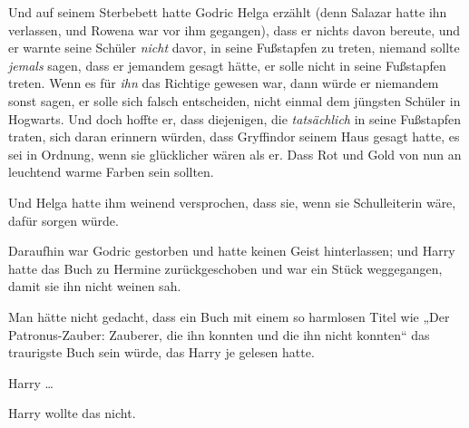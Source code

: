 Und auf seinem Sterbebett hatte Godric Helga erzählt (denn Salazar hatte ihn verlassen, und Rowena war vor ihm gegangen), dass er nichts davon bereute, und er warnte seine Schüler \emph{nicht} davor, in seine Fußstapfen zu treten, niemand sollte \emph{jemals} sagen, dass er jemandem gesagt hätte, er solle nicht in seine Fußstapfen treten. Wenn es für \emph{ihn} das Richtige gewesen war, dann würde er niemandem sonst sagen, er solle sich falsch entscheiden, nicht einmal dem jüngsten Schüler in Hogwarts. Und doch hoffte er, dass diejenigen, die \emph{tatsächlich} in seine Fußstapfen traten, sich daran erinnern würden, dass Gryffindor seinem Haus gesagt hatte, es sei in Ordnung, wenn sie glücklicher wären als er. Dass Rot und Gold von nun an leuchtend warme Farben sein sollten.

Und Helga hatte ihm weinend versprochen, dass sie, wenn sie Schulleiterin wäre, dafür sorgen würde.

Daraufhin war Godric gestorben und hatte keinen Geist hinterlassen; und Harry hatte das Buch zu Hermine zurückgeschoben und war ein Stück weggegangen, damit sie ihn nicht weinen sah.

Man hätte nicht gedacht, dass ein Buch mit einem so harmlosen Titel wie „Der Patronus-Zauber: Zauberer, die ihn konnten und die ihn nicht konnten“ das traurigste Buch sein würde, das Harry je gelesen hatte.

Harry …

Harry wollte das nicht.

